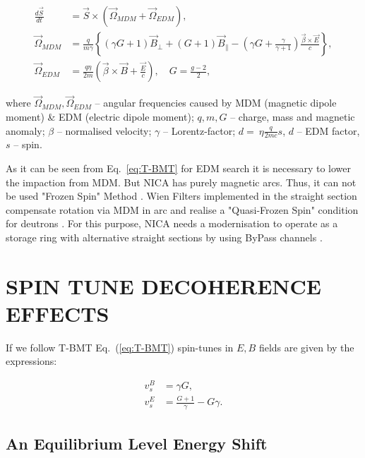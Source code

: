 \documentclass[a4paper]{jpconf}
\begin{document}
\begin{align} \label{eq:T-BMT}
\frac{{d \vec{S}}}{d t} &=\vec{S} \times\left(\vec{\Omega}_{MDM}+\vec{\Omega}_{EDM}\right), \nonumber\\
\vec{\Omega}_{MDM}&=\frac{q}{m \gamma}\left\{(\gamma G+1)\vec{B}_{\perp}+(G+1)\vec{B}_{\parallel}-\left(\gamma G+\frac{\gamma}{\gamma+1}\right) \frac{\vec{\beta} \times \vec{E}}{c}\right\}, \\
\vec{\Omega}_{EDM}&=\frac{q \eta}{2 m}\left(\vec{\beta} \times \vec{B}+\frac{\vec{E}}{c}\right), \quad G=\frac{g-2}{2},\nonumber
\end{align}

\par where $\vec{\Omega}_{MDM}, \vec{\Omega}_{EDM}$ -- angular frequencies caused by MDM (magnetic dipole moment) \& EDM (electric dipole moment); $q, m, G$ -- charge, mass and magnetic anomaly; $\beta$ -- normalised velocity; $\gamma$ -- Lorentz-factor; $d =~\eta \frac{q}{2mc}s$, $d$ -- EDM factor, $s$ -- spin.

\par As it can be seen from Eq.~\ref{eq:T-BMT} for EDM search it is necessary to lower the impaction from MDM. But NICA has purely magnetic arcs. Thus, it can not be used "Frozen Spin" Method \cite{FS}. Wien Filters implemented in the straight section compensate rotation via MDM in arc and realise a "Quasi-Frozen Spin" condition for deutrons \cite{QFS}. For this purpose, NICA needs a modernisation to operate as a storage ring with alternative straight sections by using ByPass channels \cite{ByPass}.

\section{SPIN TUNE DECOHERENCE EFFECTS}

\par If we follow T-BMT Eq.~(\ref{eq:T-BMT}) spin-tunes in $E, B$ fields are given by the expressions:

\begin{align}\label{eq:spintune}
v_s^B  &= \gamma G, \\
v_s^E  &= \frac{G+1}{\gamma}-G \gamma \nonumber.
\end{align}

\subsection{An Equilibrium Level Energy Shift}
\end{document}
